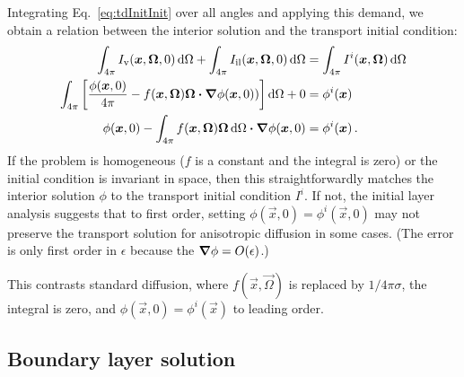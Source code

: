 Integrating Eq.~\eqref{eq:tdInitInit} over all angles and applying this demand, we
obtain a relation between the interior solution and the transport initial
condition:
\begin{align*}
\int_{4\pi} I_\mathrm{v}(\bm{x},\bm{\Omega},0) \mathop{}\!\mathrm{d}\Omega
+ \int_{4\pi} I_\mathrm{il}(\bm{x},\bm{\Omega},0) \mathop{}\!\mathrm{d}\Omega
 &= \int_{4\pi} I^i(\bm{x},\bm{\Omega}) \mathop{}\!\mathrm{d}\Omega
 \\
 \int_{4\pi} \left[ \frac{\phi(\bm{x},0)}{4\pi} - f(\bm{x},\bm{\Omega})
 \bm{\Omega}\bm{\cdot} \bm{\nabla} \phi(\bm{x},0) ) \right] \mathop{}\!\mathrm{d}\Omega
 + 0 &= \phi^i(\bm{x})
 \\
 \phi(\bm{x},0) - \int_{4\pi} f(\bm{x},\bm{\Omega})
 \bm{\Omega} \mathop{}\!\mathrm{d}\Omega \bm{\cdot} \bm{\nabla} \phi(\bm{x},0)
  &= \phi^i(\bm{x}) \,.
\end{align*}
If the problem is homogeneous ($f$ is a constant and the integral is zero) or
the initial condition is invariant in space, then
this straightforwardly matches the interior solution $\phi$ to the transport
initial condition
$I^i$. If not, the initial layer analysis suggests that to first order,
setting $\phi(\vec{x},0) = \phi^i(\vec{x},0)$ may not preserve the transport
solution for anisotropic diffusion in some cases. (The error is only first order
in $\epsilon$ because the $\bm{\nabla} \phi=O(\epsilon)$.)

This contrasts standard diffusion, where $f(\vec{x}, \vec{\Omega})$ is replaced
by $1/4\pi\sigma$, the integral is zero, and $\phi(\vec{x},0)=\phi^i(\vec{x})$
to leading order.

\subsection{Boundary layer solution}

